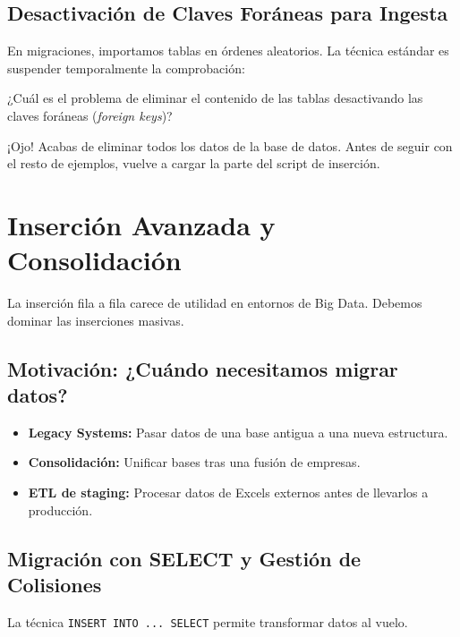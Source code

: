 \documentclass[12pt,a4paper]{article}
\begin{document}
\subsection{Desactivación de Claves Foráneas para Ingesta}
En migraciones, importamos tablas en órdenes aleatorios. La técnica estándar es suspender temporalmente la comprobación:



\begin{tcolorbox}[title=Reflexión 1]
¿Cuál es el problema de eliminar el contenido de las tablas desactivando las claves foráneas (\textit{foreign keys})?
\end{tcolorbox}

\begin{tcolorbox}[colback=red!5!white,colframe=red!75!black,title=\textbf{ADVERTENCIA}]
¡Ojo! Acabas de eliminar todos los datos de la base de datos. Antes de seguir con el resto de ejemplos, vuelve a cargar la parte del script de inserción.
\end{tcolorbox}

\section{Inserción Avanzada y Consolidación}
La inserción fila a fila carece de utilidad en entornos de Big Data. Debemos dominar las inserciones masivas.

\subsection{Motivación: ¿Cuándo necesitamos migrar datos?}
\begin{itemize}
    \item \textbf{Legacy Systems:} Pasar datos de una base antigua a una nueva estructura.
    \item \textbf{Consolidación:} Unificar bases tras una fusión de empresas.
    \item \textbf{ETL de staging:} Procesar datos de Excels externos antes de llevarlos a producción.
\end{itemize}

\subsection{Migración con SELECT y Gestión de Colisiones}
La técnica \texttt{INSERT INTO ... SELECT} permite transformar datos al vuelo.
\end{document}

